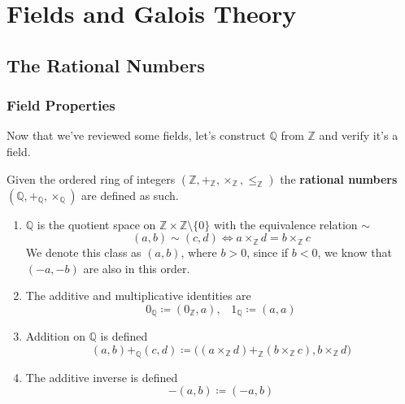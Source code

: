 \section{Fields and Galois Theory}

\subsection{The Rational Numbers}

  \subsubsection{Field Properties} 

    Now that we've reviewed some fields, let's construct $\mathbb{Q}$ from $\mathbb{Z}$ and verify it's a field. 

    \begin{definition}[Rationals]
      Given the ordered ring of integers $(\mathbb{Z}, +_{\mathbb{Z}}, \times_{\mathbb{Z}}, \leq_{\mathbb{Z}})$ the \textbf{rational numbers} $(\mathbb{Q}, +_{\mathbb{Q}}, \times_{\mathbb{Q}})$ are defined as such. 
      \begin{enumerate}
        \item $\mathbb{Q}$ is the quotient space on $\mathbb{Z} \times \mathbb{Z} \setminus \{0\}$ with the equivalence relation $\sim$ 
        \begin{equation}
          (a, b) \sim (c, d) \iff a \times_{\mathbb{Z}} d = b \times_{\mathbb{Z}} c
        \end{equation} 
        We denote this class as $(a, b)$, where $b > 0$, since if $b < 0$, we know that $(-a, -b)$ are also in this order. 

        \item The additive and multiplicative identities are 
        \begin{equation}
          0_{\mathbb{Q}} \coloneqq (0_{\mathbb{Z}}, a), \;\;\; 1_{\mathbb{Q}} \coloneqq (a, a)
        \end{equation}

        \item Addition on $\mathbb{Q}$ is defined 
        \begin{equation}
          (a, b) +_{\mathbb{Q}} (c, d) \coloneqq \big( (a \times_{\mathbb{Z}} d) +_{\mathbb{Z}} (b \times_{\mathbb{Z}} c), b \times_{\mathbb{Z}} d \big) 
        \end{equation}

        \item The additive inverse is defined 
        \begin{equation}
          -(a, b) \coloneqq (-a, b)
        \end{equation}


\end{enumerate}
\end{definition}
